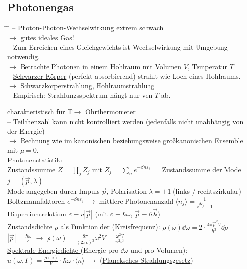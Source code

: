\subsection{Photonengas}
\begin{tabbing}
\hspace{4em} \= \hspace{4em} \= \kill
-- Photon-Photon-Wechselwirkung extrem schwach\\\>$\rightarrow$ gutes ideales Gas!\\
-- Zum Erreichen eines Gleichgewichts ist Wechselwirkung mit Umgebung notwendig.\\ \>$\rightarrow$ Betrachte Photonen in einem Hohlraum mit Volumen $V$, Temperatur $T$\\
-- \underline{Schwarzer Körper} (perfekt absorbierend) strahlt wie Loch eines Hohlraums.\\
\>$\rightarrow$ Schwarzkörperstrahlung, Hohlraumstrahlung\\
-- Empirisch: Strahlungsspektrum hängt nur von $T$ ab.\\
\>  charakteristisch für T$\rightarrow$ Ohrthermometer\\
-- Teilchenzahl kann nicht kontrolliert werden (jedenfalls nicht unabhängig von der Energie)\\\> $\rightarrow$ Rechnung wie im kanonischen beziehungsweise großkanonischen Ensemble mit $\mu = 0$.\\
\underline{Photonenstatistik}:\\
Zustandssumme $Z = \prod\limits_j Z_j$ mit $Z_j = \sum\limits_n e^{-\beta n \varepsilon_j} =$ Zustandssumme der Mode $j = (\vec{p},\lambda)$\\
Mode angegeben durch Impuls $\vec{p}$, Polarisation $\lambda = \pm 1$ (links-/ rechtszirkular)\\
Boltzmannfaktoren $e^{-\beta n \varepsilon_j}$ $\rightarrow$ mittlere Photonenanzahl $\langle n_j \rangle = \frac{1}{e^{\beta\varepsilon_j} - 1}$\\
Dispersionsrelation: $\varepsilon = c |\vec{p}|$ (mit $\varepsilon = \hbar \omega$, $\vec{p} = \hbar \vec{k}$)\\
Zustandsdichte $\rho$ als Funktion der (Kreisfrequenz): $\rho(\omega)\dd{\omega} = 2\cdot \frac{4\pi \vec{p}^2 V}{h^3}\dd{p}$\\
$|\vec{p}| = \frac{\hbar \omega}{c}$\> $\rightarrow$\> $\rho(\omega) = \frac{8\pi}{(2\pi c)^3}\omega^2 V = \frac{\omega^2 V}{\pi^2c^3}$\\
\underline{Spektrale Energiedichte } (Energie pro $\dd{\omega}$ und pro Volumen):\\
$u(\omega,T) = \frac{\rho(\omega)}{V}\cdot \hbar \omega \cdot \langle n\rangle$ $\rightarrow$  (\underline{Plancksches Strahlungsgesetz})
\end{tabbing}
